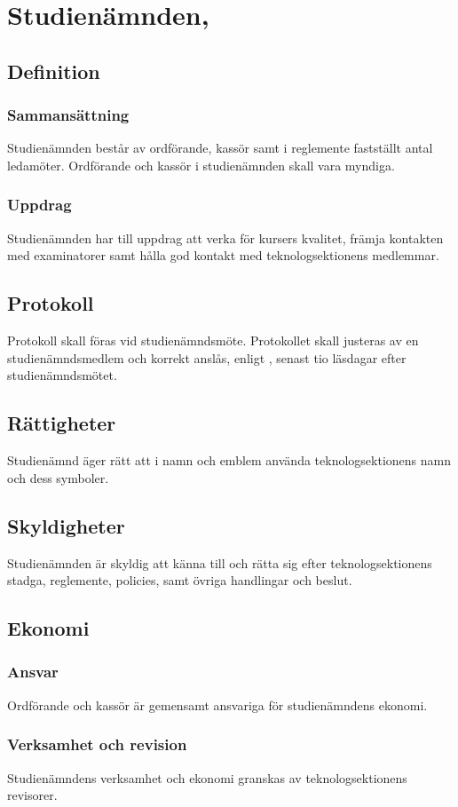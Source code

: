 \section{Studienämnden, \SNIT}

\subsection{Definition}

\subsubsection{Sammansättning}
Studienämnden består av ordförande, kassör samt i reglemente fastställt antal ledamöter. Ordförande och kassör i studienämnden skall vara myndiga.

\subsubsection{Uppdrag}
Studienämnden har till uppdrag att verka för kursers kvalitet, främja kontakten med examinatorer samt hålla god kontakt med teknologsektionens medlemmar.

\subsection{Protokoll}
Protokoll skall föras vid studienämndsmöte. Protokollet skall justeras av en studienämndsmedlem och korrekt anslås, enligt , senast tio läsdagar efter studienämndsmötet.

\subsection{Rättigheter}
Studienämnd äger rätt att i namn och emblem använda teknologsektionens namn och dess symboler.

\subsection{Skyldigheter}
Studienämnden är skyldig att känna till och rätta sig efter teknologsektionens stadga, reglemente, policies, samt övriga handlingar och beslut.

\subsection{Ekonomi}
\subsubsection{Ansvar}
Ordförande och kassör är gemensamt ansvariga för studienämndens ekonomi.
\subsubsection{Verksamhet och revision}
Studienämndens verksamhet och ekonomi granskas av teknologsektionens revisorer.